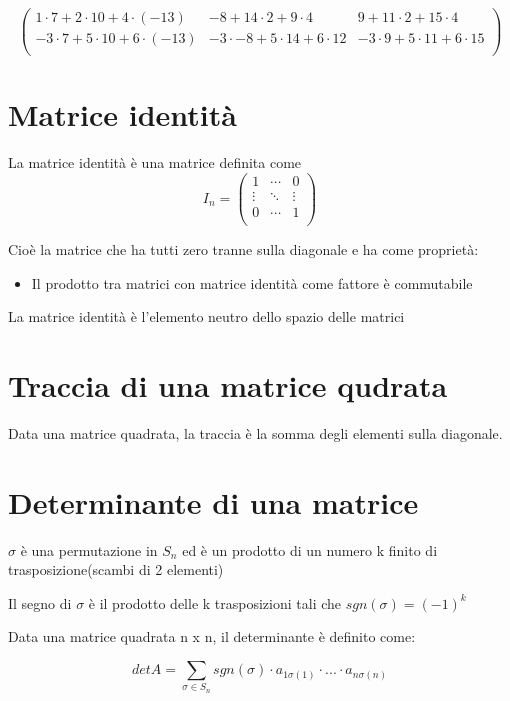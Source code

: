 \documentclass[a4paper, 10pt]{article}
\begin{document}
$$ \left(\begin{matrix}1\cdot7+2\cdot10+4\cdot\left(-13\right)&-8+14\cdot2+9\cdot4&9+11\cdot2+15\cdot4\\-3\cdot7+5\cdot10+6\cdot\left(-13\right)&-3\cdot-8+5\cdot14+6\cdot12&-3\cdot9+5\cdot11+6\cdot15\\\end{matrix}\right)
$$

\section{Matrice identità}

La matrice identità è una matrice definita come $$ I_n=\left(\begin{matrix}1&\cdots&0\\\vdots&\ddots&\vdots\\0&\cdots&1\\\end{matrix}\right) $$ 

Cioè la matrice che ha tutti zero tranne sulla diagonale e ha come proprietà:

\begin{itemize}
	\item Il prodotto tra matrici con matrice identità come fattore è commutabile
\end{itemize}

La matrice identità è l'elemento neutro dello spazio delle matrici

\section{Traccia di una matrice qudrata}

Data una matrice quadrata, la traccia è la somma degli elementi sulla diagonale.

\section{Determinante di una matrice}

$ \sigma $ è una permutazione in $ S_n $ ed è un prodotto di un numero k finito di trasposizione(scambi di 2 elementi)

Il segno di $\sigma$ è il prodotto delle k trasposizioni tali che $sgn(\sigma)=(-1)^k$

Data una matrice quadrata n x n, il determinante è definito come:

$$ detA=\sum_{\sigma\in S_n}{sgn}\left(\sigma\right)\cdot a_{1\sigma\left(1\right)}\cdot...\cdot a_{n\sigma\left(n\right)}$$
\end{document}

